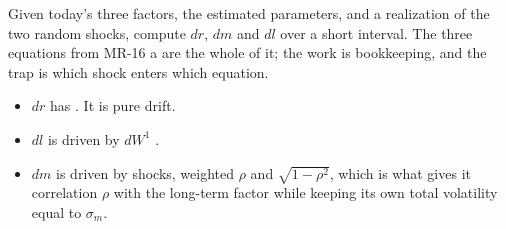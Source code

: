 \noindent\gapbadge{}\par
\vspace{6pt}

\begin{mrgapbox}[title={What the objective asks for}]
Given today's three factors, the estimated parameters, and a realization of the two random
shocks, compute $dr$, $dm$ and $dl$ over a short interval. The three equations from MR-16 a are
the whole of it; the work is bookkeeping, and the trap is which shock enters which equation.
\end{mrgapbox}

\begin{mrkeybox}[title={Read each equation before plugging in}]
\begin{itemize}
\item $dr$ has . It is pure drift.
\item $dl$ is driven by $dW^{1}$ .
\item $dm$ is driven by  shocks, weighted $\rho$ and $\sqrt{1-\rho^{2}}$, which is
      what gives it correlation $\rho$ with the long-term factor while keeping its own total
      volatility equal to $\sigma_m$.
\end{itemize}
\end{mrkeybox}

